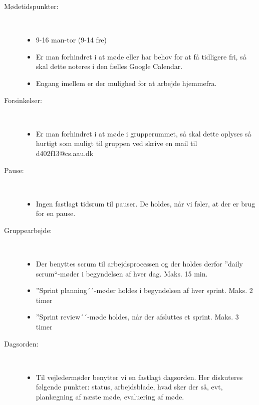 \documentclass{memoir}
\begin{document}
\begin{description}
  \item[Mødetidspunkter:] \hfill \\
  \begin{itemize}
  \item 9-16 man-tor (9-14 fre)
  \item Er man forhindret i at møde eller har behov for at få tidligere fri, så skal dette noteres i den fælles Google Calendar.
  \item Engang imellem er der mulighed for at arbejde hjemmefra.
  \end{itemize}
  
  \item[Forsinkelser:] \hfill \\
  \begin{itemize}
  \item Er man forhindret i at møde i grupperummet, så skal dette oplyses så hurtigt som muligt til gruppen ved skrive en mail til d402f13@cs.aau.dk
  \end{itemize}
  
  \item[Pause:] \hfill \\
  \begin{itemize}
  \item Ingen fastlagt tidsrum til pauser. De holdes, når vi føler, at der er brug for en pause.
  \end{itemize}
  
  \item[Gruppearbejde:] \hfill \\
  \begin{itemize}
  \item Der benyttes scrum til arbejdsprocessen og der holdes derfor ''daily scrum``-møder i begyndelsen af hver dag. Maks. 15 min.
  \item ''Sprint planning´´-møder holdes i begyndelsen af hver sprint. Maks. 2 timer
  \item ''Sprint review´´-møde holdes, når der afsluttes et sprint. Maks. 3 timer
  \end{itemize}
  
  \item[Dagsorden:] \hfill \\
  \begin{itemize}
  \item Til vejledermøder benytter vi en fastlagt dagsorden. Her diskuteres følgende punkter: status, arbejdsblade, hvad sker der så, evt, planlægning af næste møde, evaluering af møde.
  \end{itemize}
  

\end{description}
\end{document}
